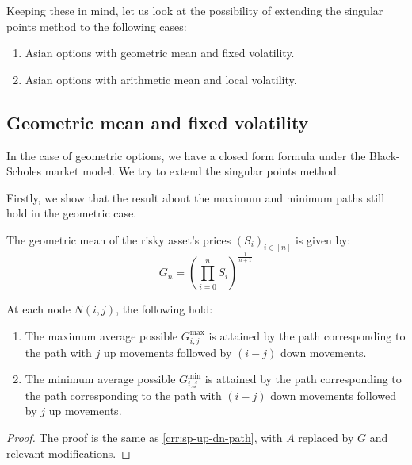 Keeping these in mind, let us look at the possibility of extending the singular points method to the following cases:
\begin{enumerate}
\item Asian options with geometric mean and fixed volatility.
\item Asian options with arithmetic mean and local volatility.
\end{enumerate}



\subsection{Geometric mean and fixed volatility}
\label{sec:gm-fixed-vol}

In the case of geometric options, we have a closed form formula under the Black-Scholes market model. We try to extend the singular points method.

Firstly, we show that the result about the maximum and minimum paths still hold in the geometric case.

\begin{dfn}
	The geometric mean of the risky asset's prices $ (S_i)_{i \in [n]} $ is given by:
	\begin{equation}
		\label{eq:gm}
		G_{n} = \left( \prod_{i=0}^n S_i \right) ^{\frac{1}{n+1}}
	\end{equation}
\end{dfn}


\begin{lmm}
	At each node $N(i,j)$, the following hold:
	\begin{enumerate}
	\item The maximum average possible $ G_{i,j}^{\max} $ is attained by the path corresponding to the path with $j$ up movements followed by $(i-j)$ down movements.
	\item The minimum average possible $ G_{i,j}^{\min} $ is attained by the path corresponding to the path corresponding to the path with $(i-j)$ down movements followed by $j$ up movements.
	\end{enumerate}
\end{lmm}

\begin{proof}
	The proof is the same as \ref{crr:sp-up-dn-path}, with $A$ replaced by $G$ and relevant modifications.
\end{proof}


